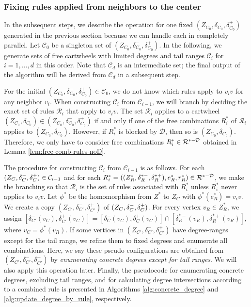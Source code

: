 \documentclass[10pt,a4paper]{article}
\def\cR{{\mathcal R}}
\def\cD{{\mathcal D}}
\begin{document}
\subsubsection{Fixing rules applied from neighbors to the center}
\label{subsub:fix_in_rules}

In the subsequent steps, we describe the operation for one fixed $(Z_{C_0}, \delta_{C_0}^-, \delta_{C_0}^+)$ generated in the previous section because we can handle each in completely parallel.
Let $\mathcal{C}_0$ be a singleton set of $(Z_{C_0}, \delta_{C_0}^-, \delta_{C_0}^+)$.
In the following, we generate sets of free cartwheels with limited degrees and tail ranges $\mathcal{C}_i$ for $i=1,\ldots,d$ in this order.
Note that $\mathcal{C}_d$ is an intermediate set; the final output of the algorithm will be derived from $\mathcal{C}_d$ in a subsequent step.

For the initial $(Z_{C_0}, \delta_{C_0}^-, \delta_{C_0}^+) \in \mathcal{C}_0$, we do not know which rules apply to $v_iv$ for any neighbor $v_i$.
When constructing $\mathcal{C}_i$ from $\mathcal{C}_{i-1}$, we will branch by deciding the exact set of rules $\mathcal{R}_i$ that apply to $v_iv$. The set $\cR_i$ applies to a cartwheel $(Z_{C_0}, \delta_{C_0})\in
(Z_{C_0}, \delta_{C_0}^-, \delta_{C_0}^+)$ if and only if one of the free combinations $R^*_i$ of $\cR_i$ applies to
$(Z_{C_0}, \delta_{C_0})$. However, if $R^*_i$ is blocked by $\cD$, then so is $(Z_{C_0}, \delta_{C_0})$. Therefore, we only have to consider free combinations
$R^*_i \in \mathcal{R}^{*-\mathcal{D}}$ obtained in Lemma \ref{lem:free-comb-rules-noD}.

The procedure for constructing $\mathcal{C}_i$ from $\mathcal{C}_{i-1}$ is as follows.
For each $(Z_C, \delta_C^-, \delta_C^+) \in \mathcal{C}_{i-1}$ and for each $R_i^*=((Z_R^*, \delta_R^{*-}, \delta_R^{*+}), e_R^*, r_R^*) \in \mathcal{R}^{*-\mathcal{D}}$, we make the branching so that $\mathcal{R}_i$ is the set of rules associated with $R_i^*$ unless $R_i^*$ never applies to $v_iv$.
Let $\phi^*$ be the homomorphism from $Z^*$ to $Z_C$ with $\phi^*(e_R^*)=v_iv$.
We create a copy $(Z_{C'}, \delta_{C'}^-, \delta_{C'}^+)$ of $(Z_C, \delta_C^-, \delta_C^+)$.
For every vertex $v_R \in Z_R^*$, we assign $[\delta_{C'}^-(v_C), \delta_{C'}^+(v_C)] = [\delta_{C}^-(v_C), \delta_{C}^+(v_C)] \cap [\delta_R^{*-}(v_R), \delta_R^{*+}(v_R)]$, where $v_C=\phi^*(v_R)$.
If some vertices in $(Z_{C'}, \delta_{C'}^-, \delta_{C'}^+)$ have degree-ranges except for the tail range, we refine them to fixed degrees and enumerate all combinations.
Here, we say these pseudo-configurations are obtained from $(Z_{C'}, \delta_{C'}^-, \delta_{C'}^+)$ by \emph{enumerating concrete degrees except for tail ranges}.
We will also apply this operation later.
Finally, the pseudocode for enumerating concrete degrees, excluding tail ranges, and for calculating degree intersections according to a combined rule is presented in Algorithms \ref{alg:concrete_degree} and \ref{alg:update_degree_by_rule}, respectively.
\end{document}
